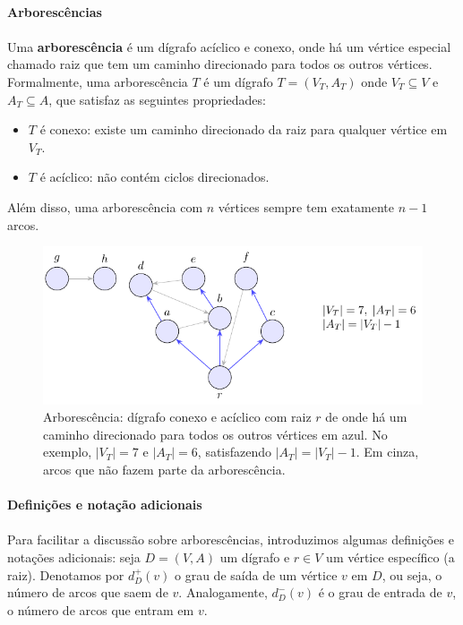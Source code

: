 \documentclass[12pt,a4paper]{article}
\def\emph#1{#1}%
\begin{document}
\paragraph{Arborescências}

\paragraph{}Uma \textbf{arborescência} é um dígrafo acíclico e conexo, onde há um vértice especial chamado \emph{raiz} que tem um caminho direcionado para todos os outros vértices. Formalmente, uma arborescência \(T\) é um dígrafo \(T = (V_T, A_T)\) onde \(V_T \subseteq V\) e \(A_T \subseteq A\), que satisfaz as seguintes propriedades:
\begin{itemize}
    \item \(T\) é conexo: existe um caminho direcionado da raiz para qualquer vértice em \(V_T\).
    \item \(T\) é acíclico: não contém ciclos direcionados.
\end{itemize}
Além disso, uma arborescência com \(n\) vértices sempre tem exatamente \(n-1\) arcos.

\begin{figure}[H]
    \centering
    \includegraphics[width=0.9\linewidth]{figures/fig_arborescencia.pdf}

    \caption{Arborescência: dígrafo conexo e acíclico com raiz $r$ de onde há um caminho direcionado para todos os outros vértices em azul. No exemplo, $|V_T|=7$ e $|A_T|=6$, satisfazendo $|A_T|=|V_T|-1$. Em cinza, arcos que não fazem parte da arborescência.}
    \label{fig:arborescencia}\end{figure}


\paragraph{Definições e notação adicionais}
\paragraph{}
Para facilitar a discussão sobre arborescências, introduzimos algumas definições e notações adicionais: seja \(D = (V, A)\) um dígrafo e \(r \in V\) um vértice específico (a raiz). Denotamos por \(d_D^+(v)\) o grau de saída de um vértice \(v\) em \(D\), ou seja, o número de arcos que saem de \(v\). Analogamente, \(d_D^-(v)\) é o grau de entrada de \(v\), o número de arcos que entram em \(v\).
\end{document}

